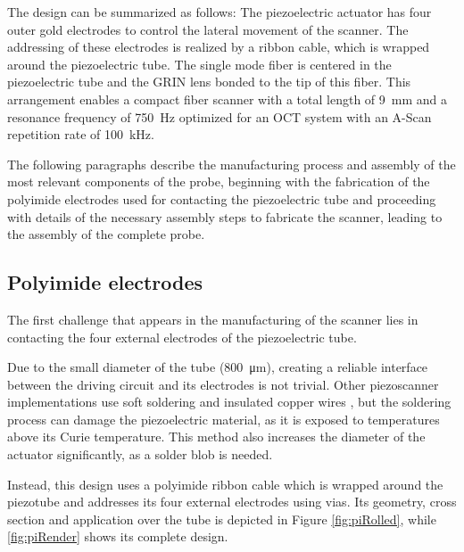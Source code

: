 \documentclass[10pt]{iopart}
\begin{document}
The design can be summarized as follows: The piezoelectric actuator has four outer gold electrodes to control the lateral movement of the scanner. The addressing of these electrodes is realized by a ribbon cable, which is wrapped around the piezoelectric tube. The single mode fiber is centered in the piezoelectric tube and the GRIN lens bonded to the tip of this fiber. This arrangement enables a compact fiber scanner with a total length of \SI{9}{\milli\meter} and a resonance frequency of \SI{750}{\hertz} optimized for an OCT system with an A-Scan repetition rate of \SI{100}{\kilo\hertz}.

The following paragraphs describe the manufacturing process and assembly of the most relevant components of the probe, beginning with the fabrication of the polyimide electrodes used for contacting the piezoelectric tube and proceeding with details of the necessary assembly steps to fabricate the scanner, leading to the assembly of the complete probe.

\subsection{Polyimide electrodes}

The first challenge that appears in the manufacturing of the scanner lies in contacting the four external electrodes of the piezoelectric tube. 

Due to the small diameter of the tube (\SI{800}{\micro\meter}), creating a reliable interface between the driving circuit and its electrodes is not trivial. Other piezoscanner implementations use soft soldering and insulated copper wires \cite{Lee2010, Meinert, Huo2010}, but the soldering process can damage the piezoelectric material, as it is exposed to temperatures above its Curie temperature. This method also increases the diameter of the actuator significantly, as a solder blob is needed. %

Instead, this design uses a polyimide ribbon cable which is wrapped around the piezotube and addresses its four external electrodes using vias. Its geometry, cross section and application over the tube is depicted in Figure \ref{fig:piRolled}, while \autoref{fig:piRender} shows its complete design.
\end{document}

